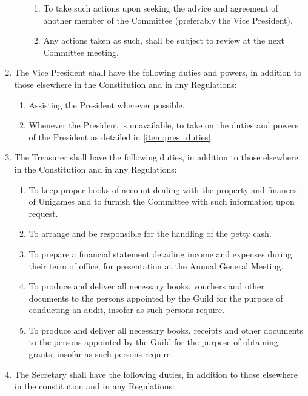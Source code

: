 \documentclass[a4paper]{article}
\begin{document}
\begin{enumerate}
\begin{enumerate}
                        \begin{enumerate}
                            \item To take such actions upon seeking the advice and agreement of another member of the Committee (preferably the Vice President).
                            \item Any actions taken as such, shall be subject to review at the next Committee meeting.
                        \end{enumerate}
              \end{enumerate}
        \item The Vice President shall have the following duties and powers, in addition to those elsewhere in the Constitution and in any Regulations:
              \begin{enumerate}
                  \item Assisting the President wherever possible.
                  \item Whenever the President is unavailable, to take on the duties and powers of the President as detailed in \cref{item:pres_duties}.
              \end{enumerate}
        \item The Treasurer shall have the following duties, in addition to those elsewhere in the Constitution and in any Regulations:
              \begin{enumerate}
                  \item To keep proper books of account dealing with the property and finances of Unigames and to furnish the Committee with such information upon request.
                  \item To arrange and be responsible for the handling of the petty cash.
                  \item To prepare a financial statement detailing income and expenses during their term of office, for presentation at the Annual General Meeting.
                  \item To produce and deliver all necessary books, vouchers and other documents to the persons appointed by the Guild for the purpose of conducting an audit, insofar as such persons require.
                  \item To produce and deliver all necessary books, receipts and other documents to the persons appointed by the Guild for the purpose of obtaining grants, insofar as such persons require.
              \end{enumerate}
        \item The Secretary shall have the following duties, in addition to those elsewhere in the constitution and in any Regulations:

\end{enumerate}
\end{document}
